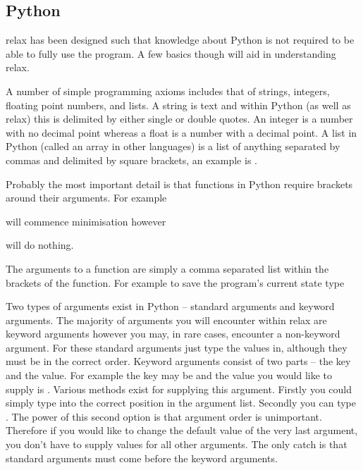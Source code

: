 
\subsection{Python}

relax has been designed such that knowledge about Python is not required to be able to fully use the program.  A few basics though will aid in understanding relax.

A number of simple programming axioms includes that of strings, integers, floating point numbers, and lists.  A string is text and within Python (as well as relax) this is delimited by either single or double quotes.  An integer is a number with no decimal point whereas a float is a number with a decimal point.  A list in Python (called an array in other languages) is a list of anything separated by commas and delimited by square brackets, an example is \prompt{[0, 1, 2, `a', 1.2143235]}.

Probably the most important detail is that functions in Python require brackets around their arguments.  For example


will commence minimisation however


will do nothing.

The arguments to a function are simply a comma separated list within the brackets of the function.  For example to save the program's current state type


Two types of arguments exist in Python -- standard arguments and keyword arguments.  The majority of arguments you will encounter within relax are keyword arguments however you may, in rare cases, encounter a non-keyword argument.  For these standard arguments just type the values in, although they must be in the correct order.  Keyword arguments consist of two parts -- the key and the value.  For example the key may be  and the value you would like to supply is .  Various methods exist for supplying this argument.  Firstly you could simply type  into the correct position in the argument list.  Secondly you can type .  The power of this second option is that argument order is unimportant.  Therefore if you would like to change the default value of the very last argument, you don't have to supply values for all other arguments.  The only catch is that standard arguments must come before the keyword arguments.


